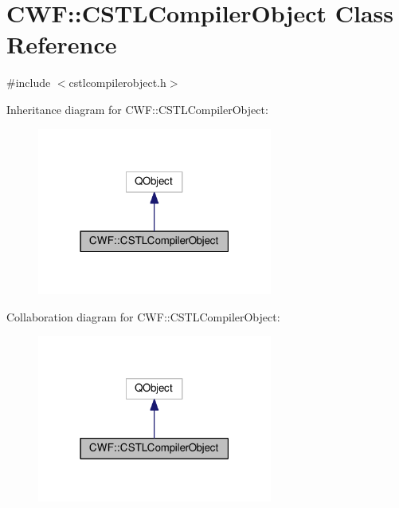 \hypertarget{class_c_w_f_1_1_c_s_t_l_compiler_object}{\section{C\+W\+F\+:\+:C\+S\+T\+L\+Compiler\+Object Class Reference}
\label{class_c_w_f_1_1_c_s_t_l_compiler_object}
}


{\ttfamily \#include $<$cstlcompilerobject.\+h$>$}



Inheritance diagram for C\+W\+F\+:\+:C\+S\+T\+L\+Compiler\+Object\+:
\nopagebreak
\begin{figure}[H]
\begin{center}
\leavevmode
\includegraphics[width=219pt]{class_c_w_f_1_1_c_s_t_l_compiler_object__inherit__graph}
\end{center}
\end{figure}


Collaboration diagram for C\+W\+F\+:\+:C\+S\+T\+L\+Compiler\+Object\+:
\nopagebreak
\begin{figure}[H]
\begin{center}
\leavevmode
\includegraphics[width=219pt]{class_c_w_f_1_1_c_s_t_l_compiler_object__coll__graph}
\end{center}
\end{figure}
